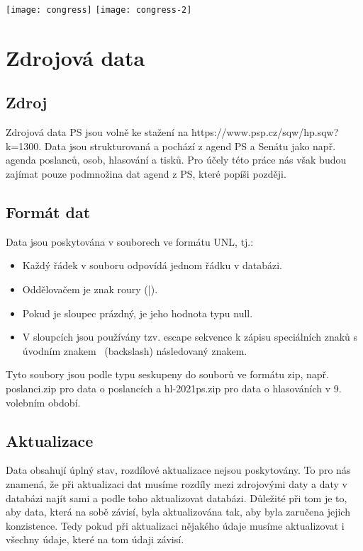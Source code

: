 \texttt{[image: congress]}
\texttt{[image: congress-2]}

\section{Zdrojová data}

\subsection{Zdroj}

Zdrojová data PS jsou volně ke stažení na https://www.psp.cz/sqw/hp.sqw?k=1300. Data jsou strukturovaná a pochází z agend PS a Senátu jako např. agenda poslanců, osob, hlasování a tisků. Pro účely této práce nás však budou zajímat pouze podmnožina dat agend z PS, které popíši později. 

\subsection{Formát dat}
Data jsou poskytována v souborech ve formátu UNL, tj.:

\begin{itemize}
	\item Každý řádek v souboru odpovídá jednom řádku v databázi.
	\item Oddělovačem je znak roury (|).
	\item Pokud je sloupec prázdný, je jeho hodnota typu null.
	\item V sloupcích jsou používány tzv. escape sekvence k zápisu speciálních znaků s úvodním znakem \ (backslash) následovaný znakem.
\end{itemize}

Tyto soubory jsou podle typu seskupeny do souborů ve formátu zip, např. poslanci.zip pro data o poslancích a hl-2021ps.zip pro data o hlasováních v 9. volebním období.

\subsection{Aktualizace}

Data obsahují úplný stav, rozdílové aktualizace nejsou poskytovány. To pro nás znamená, že při aktualizaci dat musíme rozdíly mezi zdrojovými daty a daty v databázi najít sami a podle toho aktualizovat databázi. Důležité při tom je to, aby data, která na sobě závisí, byla aktualizována tak, aby byla zaručena jejich konzistence. Tedy pokud při aktualizaci nějakého údaje musíme aktualizovat i všechny údaje, které na tom údaji závisí.

